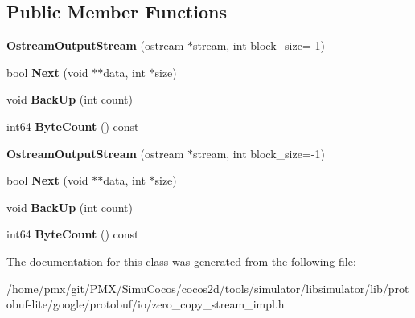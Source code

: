\subsection*{Public Member Functions}
\begin{DoxyCompactItemize}
\item 
\mbox{\label{classgoogle_1_1protobuf_1_1io_1_1OstreamOutputStream_af8a04adfa69bcfb0f7ec33f224236ffc}} 
{\bfseries Ostream\+Output\+Stream} (ostream $\ast$stream, int block\+\_\+size=-\/1)
\item 
\mbox{\label{classgoogle_1_1protobuf_1_1io_1_1OstreamOutputStream_a1651ffc5a11192d115dc998918952062}} 
bool {\bfseries Next} (void $\ast$$\ast$data, int $\ast$size)
\item 
\mbox{\label{classgoogle_1_1protobuf_1_1io_1_1OstreamOutputStream_a06792c856b98a565662fa94a058a257c}} 
void {\bfseries Back\+Up} (int count)
\item 
\mbox{\label{classgoogle_1_1protobuf_1_1io_1_1OstreamOutputStream_a72af1eb52c96d74a64e9f809a589fb0a}} 
int64 {\bfseries Byte\+Count} () const
\item 
\mbox{\label{classgoogle_1_1protobuf_1_1io_1_1OstreamOutputStream_af8a04adfa69bcfb0f7ec33f224236ffc}} 
{\bfseries Ostream\+Output\+Stream} (ostream $\ast$stream, int block\+\_\+size=-\/1)
\item 
\mbox{\label{classgoogle_1_1protobuf_1_1io_1_1OstreamOutputStream_a1651ffc5a11192d115dc998918952062}} 
bool {\bfseries Next} (void $\ast$$\ast$data, int $\ast$size)
\item 
\mbox{\label{classgoogle_1_1protobuf_1_1io_1_1OstreamOutputStream_a06792c856b98a565662fa94a058a257c}} 
void {\bfseries Back\+Up} (int count)
\item 
\mbox{\label{classgoogle_1_1protobuf_1_1io_1_1OstreamOutputStream_a72af1eb52c96d74a64e9f809a589fb0a}} 
int64 {\bfseries Byte\+Count} () const
\end{DoxyCompactItemize}


The documentation for this class was generated from the following file\+:\begin{DoxyCompactItemize}
\item 
/home/pmx/git/\+P\+M\+X/\+Simu\+Cocos/cocos2d/tools/simulator/libsimulator/lib/protobuf-\/lite/google/protobuf/io/zero\+\_\+copy\+\_\+stream\+\_\+impl.\+h\end{DoxyCompactItemize}
